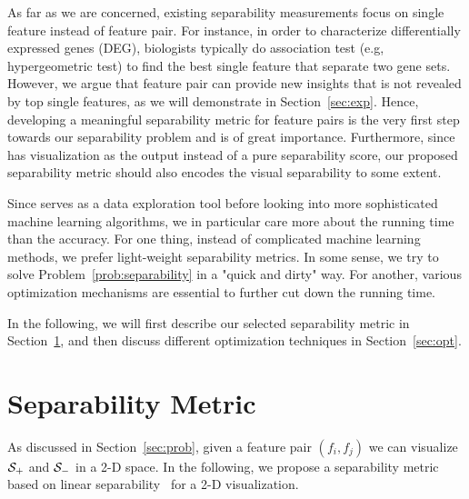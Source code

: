  As far as we are concerned, existing separability measurements focus on single feature instead of feature pair. For instance, in order to characterize differentially expressed genes (DEG), biologists typically do association test (e.g, hypergeometric test) to find the best single feature that separate two gene sets. However, we argue that feature pair can provide new insights that is not revealed by top single features, as we will demonstrate in Section~\ref{sec:exp}. Hence, developing a meaningful separability metric for feature pairs is the very first step towards our separability problem and is of great importance. Furthermore, since \genviz has visualization as the output instead of a pure separability score, our proposed separability metric should also encodes the visual separability to some extent. 

 Since \genviz serves as a data exploration tool before looking into more sophisticated machine learning algorithms, we in particular care more about the running time than the accuracy. For one thing, instead of complicated machine learning methods, we prefer light-weight separability metrics. In some sense, we try to solve Problem~\ref{prob:separability} in a "quick and dirty" way. For another, various optimization mechanisms are essential to further cut down the running time.

In the following, we will first describe our selected separability metric in Section~\ref{sec:metric}, and then discuss different optimization techniques in Section~\ref{sec:opt}.

\section{Separability Metric}\label{sec:metric}
As discussed in Section~\ref{sec:prob}, given a feature pair $(f_i,f_j)$ we can visualize $\mathcal{S}_+$ and $\mathcal{S}_-$ in a 2-D space. In the following, we propose a separability metric based on linear separability~\cite{shamos1975geometric} for a 2-D visualization. 


